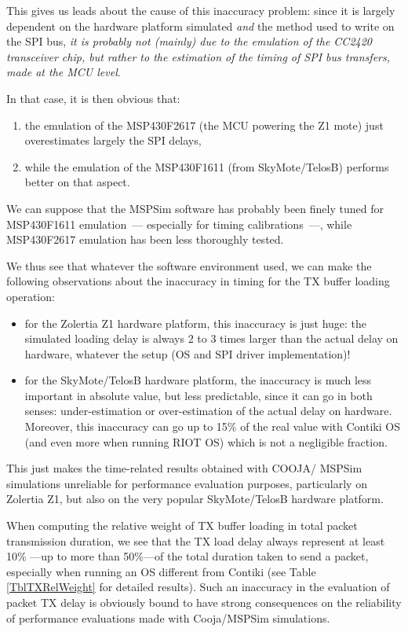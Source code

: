 \documentclass[10pt,emptycopyrightspace]{ewsn-proc}
\begin{document}
\medskip

This gives us leads about the cause of this inaccuracy problem: since
it is largely dependent on the hardware platform simulated \emph{and} the
method used to write on the SPI bus, \emph{it is probably not (mainly) due
to the emulation of the CC2420 transceiver chip, but rather to the
estimation of the timing of SPI bus transfers, made at the MCU level}.

In that case, it is then obvious that:
\begin{enumerate}[label=\textit{\alph*}.\rbrack]
\item the emulation of the MSP430F2617 (the MCU powering the Z1 mote)
just overestimates largely the SPI delays,
\item while the emulation of the MSP430F1611 (from SkyMote/TelosB) performs
better on that aspect.
\end{enumerate}
\smallskip
We can suppose that the MSPSim software has probably been finely tuned for
MSP430F1611 emulation~--- especially for timing calibrations~---, while
MSP430F2617 emulation has been less thoroughly tested.

\bigskip

We thus see that whatever the software environment used, we can make the
following observations about the inaccuracy in timing for the TX buffer
loading operation:
\begin{itemize}
\item for the Zolertia Z1 hardware platform, this inaccuracy is just huge:
the simulated loading delay is always 2 to 3 times larger than the actual
delay on hardware, whatever the setup (OS and SPI driver implementation)!
\item for the SkyMote/TelosB hardware platform, the inaccuracy is much less
important in absolute value, but less predictable, since it can go in both
senses: under-estimation or over-estimation of the actual delay on hardware.
Moreover, this inaccuracy can go up to 15\% of the real value with Contiki
OS (and even more when running RIOT OS) which is not a negligible fraction.
\end{itemize}
\smallskip
This just makes the time-related results obtained with COOJA/ MSPSim
simulations unreliable for performance evaluation purposes, particularly
on Zolertia Z1, but also on the very popular SkyMote/TelosB hardware platform.

\medskip

When computing the relative weight of TX buffer loading in total packet
transmission duration, we see that the TX load delay always represent at
least 10\% ---up to more than 50\%---of the total duration taken to send
a packet, especially when running an OS different from Contiki (see Table
\ref{TblTXRelWeight} for detailed results).
Such an inaccuracy in the evaluation of packet TX delay is obviously bound
to have strong consequences on the reliability of performance evaluations
made with Cooja/MSPSim simulations.
\end{document}
